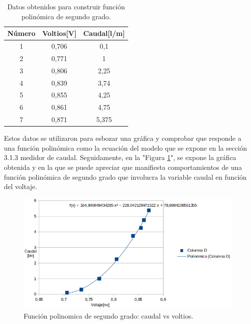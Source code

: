 \begin{table}[htpb]
	\centering
	\caption{Datos obtenidos para construir función polinómica de segundo grado.}
	\begin{tabular}{c c c }    
		\toprule
		\textbf{Número}   & \textbf{Voltios[V]} & \textbf{Caudal[l/m]}  \\
		\midrule
		1  & 0,706 & 0,1 \\
		2  & 0,771 & 1 \\
		3  & 0,806 & 2,25\\
		4  & 0,839 & 3,74 \\
		5  & 0,855 & 4,25  \\
		6  & 0,861 & 4,75 \\
		7  & 0,871 & 5,375 \\

		\bottomrule
		\hline
	\end{tabular}
	\label{tab:datos obtenidos para construir función polinómica de segundo grado.}
\end{table}
Estos datos se utilizaron para esbozar una gráfica y comprobar que responde a una función polinómica como la ecuación del modelo que se expone en la sección 3.1.3 medidor de caudal. Seguidamente, en la "Figura \ref{fig:Función polinomica de segundo grado: caudal vs voltios}", se expone la gráfica obtenida y en la que se puede apreciar que manifiesta comportamientos de una función polinómica de segundo grado que involucra la variable caudal en función del voltaje.

\begin{figure}[htpb]
	\centering
	\includegraphics[scale=.85]{./Figures/FuncionPolinomica-Caudal.png}
	\caption{Función polinomica de segundo grado: caudal vs voltios.}
	\label{fig:Función polinomica de segundo grado: caudal vs voltios}
	\end{figure}

